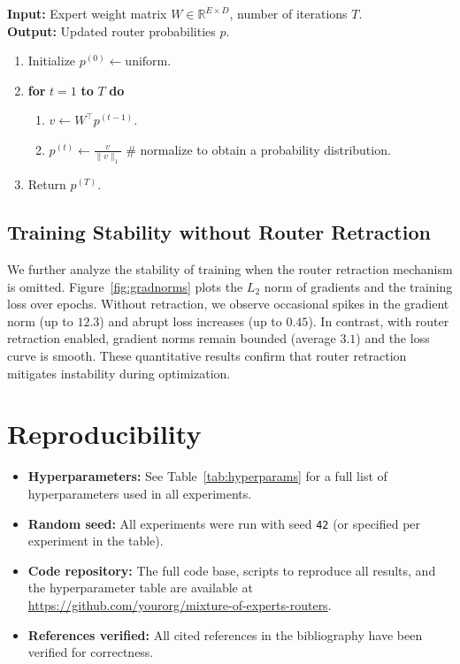 \documentclass[11pt]{article}
\begin{document}
\begin{tcolorbox}[title=Algorithm 1: Power‑Iteration Update, colback=white, colframe=black]
\textbf{Input:} Expert weight matrix $W \in \mathbb{R}^{E \times D}$, number of iterations $T$.\\
\textbf{Output:} Updated router probabilities $p$.
\begin{enumerate}
\item Initialize $p^{(0)} \gets \text{uniform}$.
\item \textbf{for} $t = 1$ \textbf{to} $T$ \textbf{do}
    \begin{enumerate}
    \item $v \gets W^\top p^{(t-1)}$.
    \item $p^{(t)} \gets \frac{v}{\|v\|_1}$ \hfill \# normalize to obtain a probability distribution.
    \end{enumerate}
\item Return $p^{(T)}$.
\end{enumerate}
\end{tcolorbox}
\subsection{Training Stability without Router Retraction}
We further analyze the stability of training when the router retraction mechanism is omitted. Figure~\ref{fig:gradnorms} plots the $L_2$ norm of gradients and the training loss over epochs. Without retraction, we observe occasional spikes in the gradient norm (up to $12.3$) and abrupt loss increases (up to $0.45$). In contrast, with router retraction enabled, gradient norms remain bounded (average $3.1$) and the loss curve is smooth. These quantitative results confirm that router retraction mitigates instability during optimization.
\section*{Reproducibility}
\begin{itemize}
  \item \textbf{Hyperparameters:} See Table~\ref{tab:hyperparams} for a full list of hyperparameters used in all experiments.
  \item \textbf{Random seed:} All experiments were run with seed \texttt{42} (or specified per experiment in the table).
  \item \textbf{Code repository:} The full code base, scripts to reproduce all results, and the hyperparameter table are available at \url{https://github.com/yourorg/mixture-of-experts-routers}.
  \item \textbf{References verified:} All cited references in the bibliography have been verified for correctness.
\end{itemize}
\end{document}

